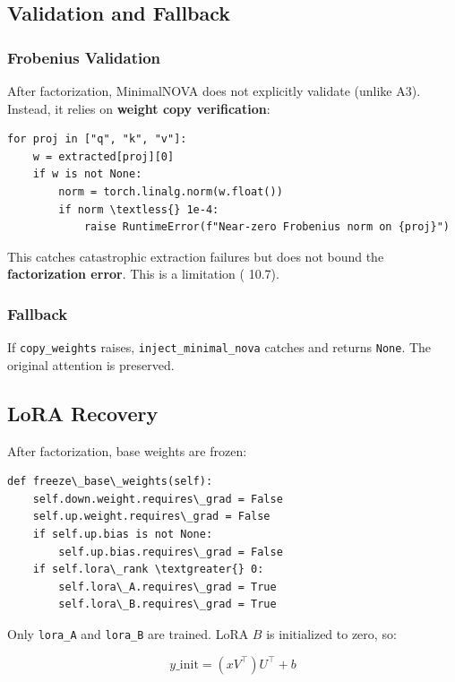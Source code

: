 \subsection{Validation and Fallback}

\subsubsection{Frobenius Validation}

After factorization, MinimalNOVA does not explicitly validate (unlike A3). 
Instead, it relies on \textbf{weight copy verification}:

\begin{lstlisting}
for proj in ["q", "k", "v"]:
    w = extracted[proj][0]
    if w is not None:
        norm = torch.linalg.norm(w.float())
        if norm \textless{} 1e-4:
            raise RuntimeError(f"Near-zero Frobenius norm on {proj}")
\end{lstlisting}

This catches catastrophic extraction failures but does not bound the 
\textbf{factorization error}. This is a limitation ( 10.7).

\subsubsection{Fallback}

If \texttt{copy\_weights} raises, \texttt{inject\_minimal\_nova} catches and returns \texttt{None}. 
The original attention is preserved.

\subsection{LoRA Recovery}

After factorization, base weights are frozen:

\begin{lstlisting}
def freeze\_base\_weights(self):
    self.down.weight.requires\_grad = False
    self.up.weight.requires\_grad = False
    if self.up.bias is not None:
        self.up.bias.requires\_grad = False
    if self.lora\_rank \textgreater{} 0:
        self.lora\_A.requires\_grad = True
        self.lora\_B.requires\_grad = True
\end{lstlisting}

Only \texttt{lora\_A} and \texttt{lora\_B} are trained. LoRA $B$ is initialized to zero, so:

\[
y\_{\text{init}} = (x V^\top) U^\top + b
\tag{4.8}
\]

